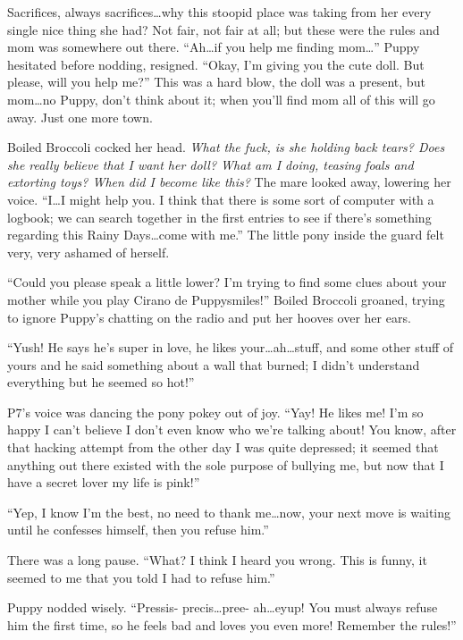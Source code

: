 Sacrifices, always sacrifices\dots why this stoopid place was taking from her every single nice thing she had? Not fair, not fair at all; but these were the rules and mom was somewhere out there. ``Ah\dots if you help me finding mom\dots'' Puppy hesitated before nodding, resigned. ``Okay, I'm giving you the cute doll. But please, will you help me?'' This was a hard blow, the doll was a present, but mom\dots no Puppy, don't think about it; when you'll find mom all of this will go away. Just one more town.

Boiled Broccoli cocked her head. \emph{What the fuck, is she holding back tears? Does she really believe that I want her doll? What am I doing, teasing foals and extorting toys? When did I become like this?} The mare looked away, lowering her voice. ``I\dots I might help you. I think that there is some sort of computer with a logbook; we can search together in the first entries to see if there's something regarding this Rainy Days\dots come with me.'' The little pony inside the guard felt very, very ashamed of herself.

\horizonline


``Could you please speak a little lower? I'm trying to find some clues about your mother while you play Cirano de Puppysmiles!'' Boiled Broccoli groaned, trying to ignore Puppy's chatting on the radio and put her hooves over her ears.

``Yush! He says he's super in love, he likes your\dots ah\dots stuff, and some other stuff of yours and he said something about a wall that burned; I didn't understand everything but he seemed so hot!''

P7's voice was dancing the pony pokey out of joy. ``Yay! He likes me! I'm so happy I can't believe I don't even know who we're talking about! You know, after that hacking attempt from the other day I was quite depressed; it seemed that anything out there existed with the sole purpose of bullying me, but now that I have a secret lover my life is pink!''

``Yep, I know I'm the best, no need to thank me\dots now, your next move is waiting until he confesses himself, then you refuse him.''

There was a long pause. ``What? I think I heard you wrong. This is funny, it seemed to me that you told I had to refuse him.''

Puppy nodded wisely. ``Pressis- precis\dots pree- ah\dots eyup! You must always refuse him the first time, so he feels bad and loves you even more! Remember the rules!''

